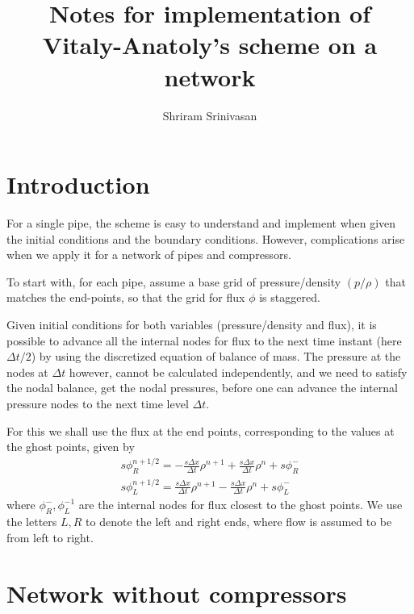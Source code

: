 \documentclass{amsart}
\begin{document}
\title{Notes for implementation  of Vitaly-Anatoly's scheme on a network}

\author{Shriram Srinivasan}
\address{LANL}




\maketitle

\section{Introduction}

For a single pipe, the scheme is easy to understand and implement when given the initial conditions and the boundary conditions. However,  complications arise when we apply it for a network of pipes and compressors.

To start with, for each pipe, assume a base grid  of  pressure/density $(p/\rho)$ that matches the end-points, so that the grid for flux $\phi$ is staggered.  

Given initial conditions for both variables (pressure/density and flux), it is possible to advance all the internal nodes for flux to the next time instant (here $\Delta t/2$) by using the discretized equation of balance of mass.  The pressure at the nodes at $\Delta t$ however, cannot be calculated independently, and we need to satisfy the nodal balance, get the nodal pressures, before one can advance the internal pressure nodes to the next time level $\Delta t$.

For this we shall use the flux at the end points, corresponding to the values at the ghost points, given by
\begin{align}
 s \phi_R^{n+1/2} = -\frac{s \Delta x}{\Delta t}\rho^{n+1} + \frac{s \Delta x}{\Delta t}\rho^{n} + s\phi_R^{-} \\
 s \phi_L^{n+1/2} = \frac{s \Delta x}{\Delta t}\rho^{n+1} - \frac{s \Delta x}{\Delta t}\rho^{n} + s\phi_L^{-}
\end{align}
where $\phi_R^{-}, \phi_L^{-1}$ are the internal nodes for flux closest to the ghost points. 
We use the letters $L, R$ to denote the left and right ends, where flow is assumed to be from left to right.

\section{Network without compressors}
\end{document}
